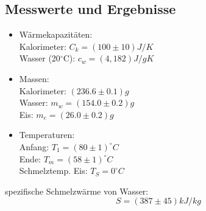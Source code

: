 \documentclass[12pt,a4paper]{article}
\begin{document}
\begin{multicols}{2}


\subsection{Messwerte und Ergebnisse}

\begin{itemize}
	\item Wärmekapazitäten:\\
	Kalorimeter: $C_k = (100 \pm 10) J/K$\\
	Wasser (20$^{\circ}$C): $c_w=(4,182) J/gK$
	
	\item Massen:\\
	Kalorimeter: $(236.6 \pm 0.1)g$\\
	Wasser: $m_w = (154.0 \pm 0.2)g$\\
	Eis: $m_e = (26.0 \pm 0.2)g$
	
	\item Temperaturen:\\
	Anfang: $T_1=(80 \pm 1) ^\circ C$\\
	Ende: $T_m=(58 \pm 1) ^\circ C$\\
	Schmelztemp. Eis: $T_S = 0 ^\circ C$
\end{itemize}

\noindent spezifische Schmelzwärme von Wasser:\\
$$S =(387 \pm 45) kJ/kg$$


\end{multicols}
\end{document}
